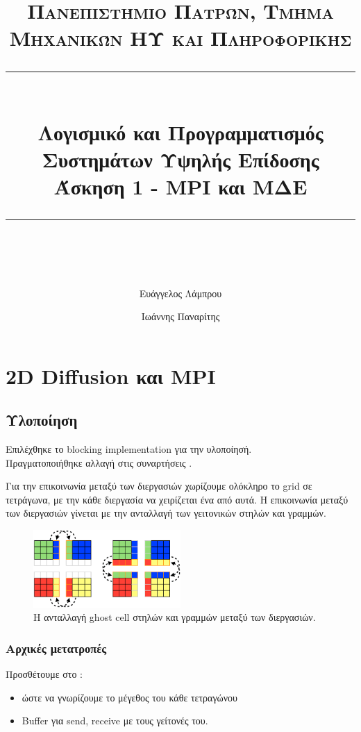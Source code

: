 \documentclass[11pt]{scrartcl} %
\title{	
	\normalfont\normalsize
	\textsc{Πανεπιστήμιο Πατρών, Τμήμα Μηχανικών ΗΥ και Πληροφορικής}\\ %
	\vspace{25pt} %
	\rule{\linewidth}{0.5pt}\\ %
	\vspace{20pt} %
	{\LARGE Λογισμικό και Προγραμματισμός Συστημάτων Υψηλής Επίδοσης\\ Άσκηση 1 - MPI και ΜΔΕ}\\ %
	\vspace{12pt} %
	\rule{\linewidth}{2pt}\\ %
	\vspace{12pt} %
}
\author{Ευάγγελος Λάμπρου \and Ιωάννης Παναρίτης} %
\date{} %
\begin{document}
\maketitle 

\section{2D Diffusion και MPI}

    \subsection{Υλοποίηση}
        Επιλέχθηκε το blocking implementation για την υλοποίησή.\\
        Πραγματοποιήθηκε αλλαγή στις συναρτήσεις .

        Για την επικοινωνία μεταξύ των διεργασιών χωρίζουμε ολόκληρο το grid σε τετράγωνα, με την κάθε διεργασία να χειρίζεται ένα από αυτά.
        Η επικοινωνία μεταξύ των διεργασιών γίνεται με την ανταλλαγή των γειτονικών στηλών και γραμμών. \cite{ghostcellpattern}

        \begin{figure}[htpb]
            \centering
            \includegraphics[width=0.5\textwidth]{./assets/ghostcells.png}
            \caption{Η ανταλλαγή ghost cell στηλών και γραμμών μεταξύ των διεργασιών.}
        \end{figure}
        
        \subsubsection*{Αρχικές μετατροπές}
            Προσθέτουμε στο :
            \begin{itemize}
                \item {} ώστε να γνωρίζουμε το μέγεθος του κάθε τετραγώνου
                \item Buffer για send, receive με τους γείτονές του.
            \end{itemize}
            
\end{document}
